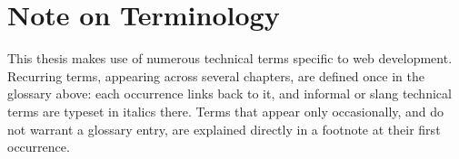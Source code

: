 \section*{Note on Terminology}

This thesis makes use of numerous technical terms specific to web development. Recurring terms, appearing across several chapters, are defined once in the glossary above: each occurrence links back to it, and informal or slang technical terms are typeset in italics there. Terms that appear only occasionally, and do not warrant a glossary entry, are explained directly in a footnote at their first occurrence.
